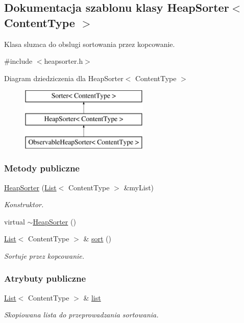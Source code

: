 \hypertarget{class_heap_sorter}{\subsection{Dokumentacja szablonu klasy Heap\-Sorter$<$ Content\-Type $>$}
\label{class_heap_sorter}
}


Klasa sluzaca do obslugi sortowania przez kopcowanie.  




{\ttfamily \#include $<$heapsorter.\-h$>$}

Diagram dziedziczenia dla Heap\-Sorter$<$ Content\-Type $>$\begin{figure}[H]
\begin{center}
\leavevmode
\includegraphics[height=3.000000cm]{class_heap_sorter}
\end{center}
\end{figure}
\subsubsection*{Metody publiczne}
\begin{DoxyCompactItemize}
\item 
\hyperlink{class_heap_sorter_a28b0447f09b338f37ab3413c2fb8a021}{Heap\-Sorter} (\hyperlink{class_list}{List}$<$ Content\-Type $>$ \&my\-List)
\begin{DoxyCompactList}\small\item\em Konstruktor. \end{DoxyCompactList}\item 
virtual \hyperlink{class_heap_sorter_acc8436675592eade1a5dfda90ecb9947}{$\sim$\-Heap\-Sorter} ()
\item 
\hyperlink{class_list}{List}$<$ Content\-Type $>$ \& \hyperlink{class_heap_sorter_a0617d40d6d46a65535e7af76f2957898}{sort} ()
\begin{DoxyCompactList}\small\item\em Sortuje przez kopcowanie. \end{DoxyCompactList}\end{DoxyCompactItemize}
\subsubsection*{Atrybuty publiczne}
\begin{DoxyCompactItemize}
\item 
\hyperlink{class_list}{List}$<$ Content\-Type $>$ \& \hyperlink{class_heap_sorter_ae5061b641a597893a2e7f747c9cc15f2}{list}
\begin{DoxyCompactList}\small\item\em Skopiowana lista do przeprowadzania sortowania. \end{DoxyCompactList}\end{DoxyCompactItemize}


